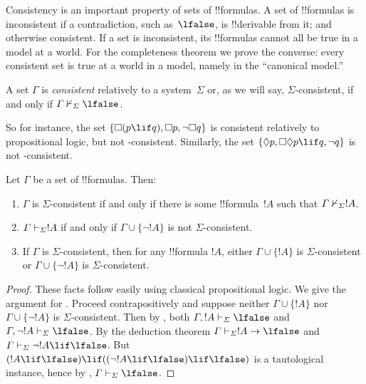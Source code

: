 \documentclass[../../../include/open-logic-section]{subfiles}
\begin{document}


Consistency is an important property of sets of !!{formula}s. A set of
!!{formula}s is inconsistent if a contradiction, such as~$\lfalse$, is
!!{derivable} from it; and otherwise consistent. If a set is
inconsistent, its !!{formula}s cannot all be true in a model at a
world. For the completeness theorem we prove the converse: every
consistent set is true at a world in a model, namely in the ``canonical
model.''

\begin{defn}
  A set $\Gamma$ is \emph{consistent} relatively to a system~$\Sigma$
  or, as we will say, $\Sigma$-consistent, if and only if $\Gamma
  \Proves/[\Sigma] \lfalse$.
\end{defn}

So for instance, the set $\{ \Box(p \lif q), \Box p, \lnot\Box q \}$ is
consistent relatively to propositional logic, but not
-consistent. Similarly, the set $\{ \Diamond p, \Box\Diamond
p \lif q, \lnot q \}$ is not -consistent.

\begin{prop}
  Let $\Gamma$ be a set of !!{formula}s. Then:
  \begin{enumerate}
  \item $\Gamma$ is $\Sigma$-consistent if and only if there is
    some !!{formula}~$!A$ such that $\Gamma \Proves/[\Sigma]
    !A$.
  \item {}%
    $\Gamma \Proves[\Sigma] !A$ if and only if $\Gamma \cup \{
    \lnot!A \}$ is not $\Sigma$-consistent.
  \item {}%
    If $\Gamma$ is $\Sigma$-consistent, then for any !!{formula}
    $!A$, either $\Gamma \cup \{ !A \}$ is
    $\Sigma$-consistent or $\Gamma \cup \{ \lnot!A \}$ is
    $\Sigma$-consistent.
  \end{enumerate}
\end{prop}

\begin{proof}
  These facts follow easily using classical propositional logic. We
  give the argument for . Proceed
  contrapositively and suppose neither $\Gamma \cup \{ !A \}$ nor
  $\Gamma \cup \{ \lnot!A \}$ is $\Sigma$-consistent. Then by
  , both $\Gamma, !A \Proves[\Sigma]
  \lfalse$ and $\Gamma, \lnot !A \Proves[\Sigma] \lfalse$. By the
  deduction theorem $\Gamma \Proves[\Sigma] !A \to \lfalse$ and
  $\Gamma \Proves[\Sigma] \lnot!A \lif \lfalse$. But $(!A \lif
  \lfalse) \lif ((\lnot!A \lif \lfalse) \lif \lfalse)$ is a
  tautological instance, hence by
  ,
  $\Gamma \Proves[\Sigma] \lfalse$.
\end{proof}
\end{document}
